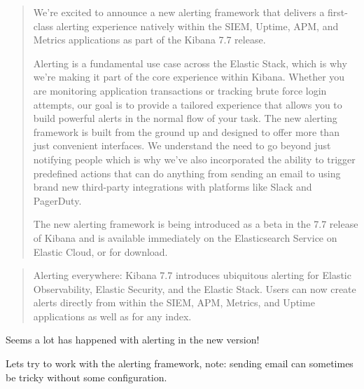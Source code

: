 \documentclass[Screen16to9,17pt]{foils}
\begin{document}

\begin{quote}\small
We’re excited to announce a new alerting framework that delivers a first-class alerting experience natively within the SIEM, Uptime, APM, and Metrics applications as part of the Kibana 7.7 release.

Alerting is a fundamental use case across the Elastic Stack, which is why we’re making it part of the core experience within Kibana. Whether you are monitoring application transactions or tracking brute force login attempts, our goal is to provide a tailored experience that allows you to build powerful alerts in the normal flow of your task. The new alerting framework is built from the ground up and designed to offer more than just convenient interfaces. We understand the need to go beyond just notifying people which is why we’ve also incorporated the ability to trigger predefined actions that can do anything from sending an email to using brand new third-party integrations with platforms like Slack and PagerDuty.

The new alerting framework is being introduced as a beta in the 7.7 release of Kibana and is available immediately on the Elasticsearch Service on Elastic Cloud, or for download.
\end{quote}

\begin{list2}
\item{}
\item {}
\item {}
\item {}
\end{list2}




\begin{quote}
Alerting everywhere: Kibana 7.7 introduces ubiquitous alerting for Elastic Observability, Elastic Security, and the Elastic Stack. Users can now create alerts directly from within the SIEM, APM, Metrics, and Uptime applications as well as for any index.
\end{quote}

\begin{list2}
\item Seems a lot has happened with alerting in the new version!
\item Lets try to work with the alerting framework, note: sending email can sometimes be tricky without some configuration.
\end{list2}
\end{document}
